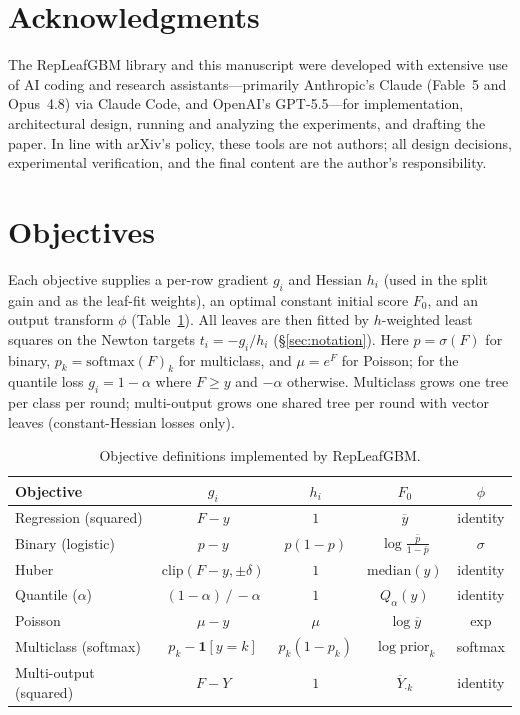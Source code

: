 \documentclass[11pt]{article}
\newcommand{\ind}[1]{\mathbf{1}\!\left[#1\right]}
\begin{document}
\section*{Acknowledgments}
The RepLeafGBM library and this manuscript were developed with extensive use of AI coding and
research assistants---primarily Anthropic's Claude (Fable~5 and Opus~4.8) via Claude Code, and
OpenAI's GPT-5.5---for implementation, architectural design, running and analyzing the
experiments, and drafting the paper. In line with arXiv's policy, these tools are not authors;
all design decisions, experimental verification, and the final content are the author's
responsibility.

\appendix

\section{Objectives}
\label{app:objectives}

Each objective supplies a per-row gradient $g_i$ and Hessian $h_i$ (used in the split gain
and as the leaf-fit weights), an optimal constant initial score $F_0$, and an output
transform $\phi$ (Table~\ref{tab:objectives}). All leaves are then fitted by $h$-weighted
least squares on the Newton targets $t_i=-g_i/h_i$ (\S\ref{sec:notation}). Here
$p=\sigma(F)$ for binary, $p_k=\mathrm{softmax}(F)_k$ for multiclass, and $\mu=e^{F}$ for
Poisson; for the quantile loss $g_i=1-\alpha$ where $F\ge y$ and $-\alpha$ otherwise.
Multiclass grows one tree per class per round; multi-output grows one shared tree per round
with vector leaves (constant-Hessian losses only).

\begin{table}[h]
\centering
\small
\caption{Objective definitions implemented by RepLeafGBM.}
\label{tab:objectives}
\begin{tabular}{lcccc}
\toprule
Objective & $g_i$ & $h_i$ & $F_0$ & $\phi$ \\
\midrule
Regression (squared)  & $F-y$ & $1$ & $\overline{y}$ & identity \\
Binary (logistic)     & $p-y$ & $p(1-p)$ & $\log\frac{\bar p}{1-\bar p}$ & $\sigma$ \\
Huber                 & $\mathrm{clip}(F-y,\pm\delta)$ & $1$ & $\mathrm{median}(y)$ & identity \\
Quantile ($\alpha$)   & $(1-\alpha)\,/\,{-}\alpha$ & $1$ & $Q_{\alpha}(y)$ & identity \\
Poisson               & $\mu-y$ & $\mu$ & $\log\overline{y}$ & $\exp$ \\
Multiclass (softmax)  & $p_k-\ind{y=k}$ & $p_k(1-p_k)$ & $\log\mathrm{prior}_k$ & softmax \\
Multi-output (squared)& $F-Y$ & $1$ & $\overline{Y}_{\cdot k}$ & identity \\
\bottomrule
\end{tabular}
\end{table}
\end{document}
